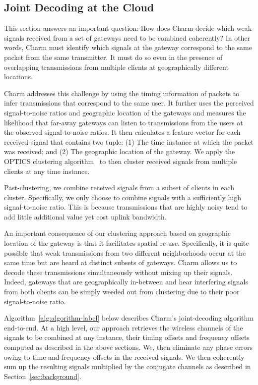 \subsection{Joint Decoding at the Cloud}
\label{sec:joint-decoding-cloud}
This section answers an important question: How does Charm decide which weak
signals received from a set of gateways need to be combined coherently? In
other words, Charm must identify which signals at the gateway correspond to
the same packet from the same transmitter. It must do so even in the presence
of overlapping transmissions from multiple clients at geographically different
locations.

 Charm addresses this challenge by
using the timing information of packets to infer transmissions that correspond
to the same user. It further uses the perceived signal-to-noise ratios and
geographic location of the gateways and measures the likelihood that far-away
gateways can listen to transmissions from the users at the observed
signal-to-noise ratios. It then calculates a feature vector for each received
signal that contains two tuple: (1) The time instance at which the packet was
received; and (2) The geographic location of the gateway. We apply the OPTICS
clustering algorithm~\cite{ankerst1999optics} to then cluster received signals
from multiple clients at any time instance.

Past-clustering, we combine received signals from a subset of clients in each
cluster. Specifically, we only choose to combine signals with a sufficiently
high signal-to-noise ratio. This is because transmissions that are highly
noisy tend to add little additional value yet cost uplink bandwidth.

An important consequence of our clustering approach based on geographic
location of the gateway is that it facilitates spatial re-use. Specifically,
it is quite possible that weak transmissions from two different neighborhoods
occur at the same time but are heard at distinct subsets of gateways. Charm
allows us to decode these transmissions simultaneously without mixing up their
signals. Indeed, gateways that are geographically in-between and hear
interfering signals from both clients can be simply weeded out from clustering
due to their poor signal-to-noise ratio.

 Algorithm~\ref{alg:algorithm-label}
below describes Charm's joint-decoding algorithm end-to-end. At a high level,
our approach retrieves the wireless channels of the signals to be combined at
any instance, their timing offsets and frequency offsets computed as described
in the above sections. We, then eliminate any phase errors owing to time and
frequency offsets in the received signals. We then coherently sum up the
resulting signals multiplied by the conjugate channels as described in
Section~\ref{sec:background}.

